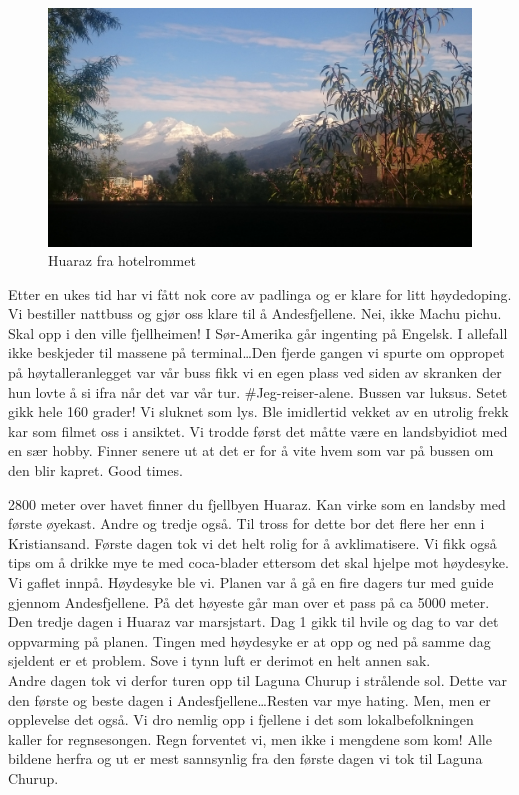 \begin{figure}[!h]
	\centering
	\includegraphics[width=\textwidth]{Hotellromhuaraz}
	\caption{Huaraz fra hotelrommet}	
\label{fig:huaraz}
\end{figure}
Etter en ukes tid har vi fått nok core av padlinga og er klare for
litt høydedoping. Vi bestiller nattbuss og gjør oss klare til å
Andesfjellene. Nei, ikke Machu pichu. Skal opp i den ville
fjellheimen! I Sør-Amerika går ingenting på Engelsk. I allefall ikke
beskjeder til massene på terminal\ldots Den fjerde
gangen vi spurte om oppropet på høytalleranlegget var vår buss fikk vi
en egen plass ved siden av skranken der hun lovte å si ifra når det var vår
tur. \#Jeg-reiser-alene. Bussen var luksus. Setet gikk hele 160 grader!
Vi sluknet som lys. Ble imidlertid vekket av en utrolig frekk kar som
filmet oss i ansiktet. Vi trodde først det måtte være en landsbyidiot
med en sær hobby. Finner senere ut at det er for å vite hvem som var
på bussen om den blir kapret. Good times. 


2800 meter over havet finner du fjellbyen Huaraz. Kan virke som en
landsby med første øyekast. Andre og tredje også. Til tross for dette
bor det flere her enn i Kristiansand. Første dagen tok vi det helt
rolig for å avklimatisere. Vi  fikk også tips om å drikke mye te med coca-blader
ettersom det skal hjelpe mot høydesyke. Vi gaflet innpå. Høydesyke ble
vi. Planen var å gå en fire dagers tur med guide gjennom
Andesfjellene. På det høyeste går man over et pass på ca 5000 meter. Den tredje dagen i
Huaraz var marsjstart. Dag 1 gikk til hvile og  dag to var det
oppvarming på planen. Tingen med
høydesyke er at opp og ned på samme dag sjeldent er et problem. Sove i tynn luft er
derimot en helt annen sak.\\

Andre dagen tok vi derfor turen opp til Laguna Churup i
strålende sol. Dette var den første og beste dagen i
Andesfjellene\ldots  Resten
var mye hating. Men, men er opplevelse det også. 
Vi dro nemlig opp i fjellene i det som lokalbefolkningen kaller for
regnsesongen. Regn forventet vi, men ikke i mengdene som kom! Alle bildene
herfra og ut er mest sannsynlig fra den første dagen vi tok til Laguna
Churup.\\ 



